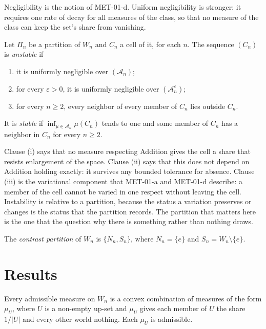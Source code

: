 \documentclass{situationist-preprint}
\begin{document}
Negligibility is the notion of MET-01-d. Uniform negligibility is stronger: it requires one rate of decay for all measures of the class, so that no measure of the class can keep the set's share from vanishing.

\begin{definition}\label{d:unstable}
Let $\Pi_n$ be a partition of $W_n$ and $C_n$ a cell of it, for each $n$. The sequence $(C_n)$ is \emph{unstable} if
\begin{enumerate}[label=(\roman*)]
\item it is uniformly negligible over $(\mathcal{A}_n)$;
\item for every $\varepsilon > 0$, it is uniformly negligible over $(\mathcal{A}_n^{\varepsilon})$;
\item for every $n \geq 2$, every neighbor of every member of $C_n$ lies outside $C_n$.
\end{enumerate}
It is \emph{stable} if $\inf_{\mu \in \mathcal{A}_n} \mu(C_n)$ tends to one and some member of $C_n$ has a neighbor in $C_n$ for every $n \geq 2$.
\end{definition}

Clause (i) says that no measure respecting Addition gives the cell a share that resists enlargement of the space. Clause (ii) says that this does not depend on Addition holding exactly: it survives any bounded tolerance for absence. Clause (iii) is the variational component that MET-01-a and MET-01-d describe: a member of the cell cannot be varied in one respect without leaving the cell. Instability is relative to a partition, because the status a variation preserves or changes is the status that the partition records. The partition that matters here is the one that the question why there is something rather than nothing draws.

\begin{definition}\label{d:contrast}
The \emph{contrast partition} of $W_n$ is $\{N_n, S_n\}$, where $N_n = \{e\}$ and $S_n = W_n \setminus \{e\}$.
\end{definition}

\section{Results}\label{s:results}

\begin{lemma}[Decomposition]\label{l:decomp}
Every admissible measure on $W_n$ is a convex combination of measures of the form $\mu_U$, where $U$ is a non-empty up-set and $\mu_U$ gives each member of $U$ the share $1/|U|$ and every other world nothing. Each $\mu_U$ is admissible.
\end{lemma}
\end{document}

